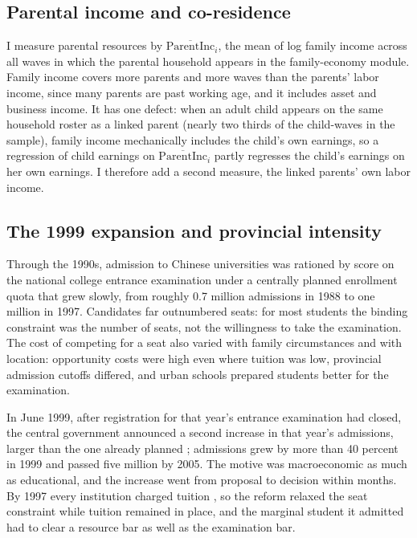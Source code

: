 \documentclass[11pt]{article}
\newcommand{\pinc}{\overline{\mathrm{ParentInc}}}
\begin{document}
\subsection{Parental income and co-residence}
\label{sec:parentinc}

I measure parental resources by $\pinc_i$, the mean of log family income across all waves in which the parental household appears in the family-economy module. Family income covers more parents and more waves than the parents' labor income, since many parents are past working age, and it includes asset and business income. It has one defect: when an adult child appears on the same household roster as a linked parent (nearly two thirds of the child-waves in the sample), family income mechanically includes the child's own earnings, so a regression of child earnings on $\pinc_i$ partly regresses the child's earnings on her own earnings. I therefore add a second measure, the linked parents' own labor income. 

\subsection{The 1999 expansion and provincial intensity}
\label{sec:background}

Through the 1990s, admission to Chinese universities was rationed by score on the national college entrance examination under a centrally planned enrollment quota that grew slowly, from roughly 0.7 million admissions in 1988 to one million in 1997. Candidates far outnumbered seats: for most students the binding constraint was the number of seats, not the willingness to take the examination. The cost of competing for a seat also varied with family circumstances and with location: opportunity costs
were high even where tuition was low, provincial admission cutoffs
differed, and urban schools prepared students better for the
examination.

In June 1999, after registration for that year's entrance examination
had closed, the central government announced a second increase in that year's admissions, larger than the one already planned \citep{LiWhalleyXing2014}; admissions grew by more than 40 percent in 1999 and passed five million by 2005. The motive was macroeconomic as much as educational, and the increase went from proposal to decision within months. By 1997 every institution charged tuition \citep{DongWan2012}, so the reform relaxed the seat constraint while tuition remained in place, and the marginal student it admitted had to clear a resource bar as well as the examination bar.
\end{document}
